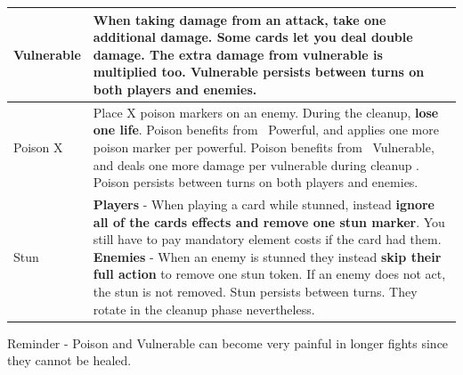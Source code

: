 \begin{longtable}{|p{2.5cm}|p{13.7cm}|}
	
	\hline
	Vulnerable \symVulnerable & When taking damage from an attack, \textbf{take one additional damage}. Some cards let you deal double damage. The extra damage from vulnerable is multiplied too. Vulnerable persists between turns on both players and enemies. \\
	\hline
	Poison X \symPoison & Place X poison markers on an enemy. During the cleanup, \textbf{lose one life}. Poison benefits from \symPowerful~Powerful, and applies one more poison marker per powerful. Poison benefits from \symVulnerable~Vulnerable, and deals one more damage per vulnerable during cleanup .  Poison persists between turns on both players and enemies. \\
	\hline
	Stun \symStun & \textbf{Players} - When playing a card while stunned, instead \textbf{ignore all of the cards effects and remove one stun marker}. You still have to pay mandatory element costs if the card had them. \hspace*{12cm} \linebreak \textbf{Enemies} - When an enemy is stunned they instead \textbf{skip their full action} to remove one stun token. If an enemy does not act, the stun is not removed. Stun persists between turns. They rotate in the cleanup phase nevertheless.\\
	\hline
	
	
	
\end{longtable}


\begin{tcolorbox}[colframe=blue, colback=white]
	Reminder - Poison and Vulnerable can become very painful in longer fights since they cannot be healed. 
\end{tcolorbox}
